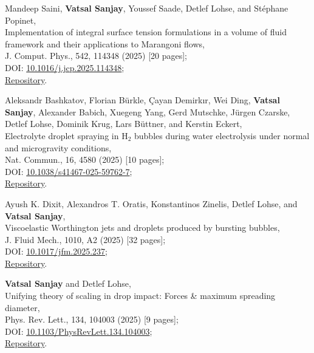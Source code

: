 \documentclass[10pt,a4paper,colorlinks,linkcolor=blue,urlcolor=blue,citecolor=blue]{moderncv}
\begin{document}
\begin{enumerate}[leftmargin=1.5em,label=\textbf{[\arabic*]}]
	\item Mandeep Saini, \textbf{Vatsal Sanjay}, Youssef Saade, Detlef Lohse, and Stéphane Popinet,\\
	Implementation of integral surface tension formulations in a volume of fluid framework and their applications to Marangoni flows,\\
	J. Comput. Phys., 542, 114348 (2025) [20 pages];\\
	\faFile\hspace{0.2em}DOI: \href{https://doi.org/10.1016/j.jcp.2025.114348}{10.1016/j.jcp.2025.114348};\\
	\faGithub\hspace{0.2em}\href{https://github.com/comphy-lab/marangoniSheet}{Repository}.

	\item Aleksandr Bashkatov, Florian Bürkle, Çayan Demirkır, Wei Ding, \textbf{Vatsal Sanjay}, Alexander Babich, Xuegeng Yang, Gerd Mutschke, Jürgen Czarske, Detlef Lohse, Dominik Krug, Lars Büttner, and Kerstin Eckert,\\
	Electrolyte droplet spraying in H$_2$ bubbles during water electrolysis under normal and microgravity conditions,\\
	Nat. Commun., 16, 4580 (2025) [10 pages];\\
	\faFile\hspace{0.2em}DOI: \href{https://doi.org/10.1038/s41467-025-59762-7}{10.1038/s41467-025-59762-7};\\
	\faGithub\hspace{0.2em}\href{https://github.com/VatsalSy/Asymmetries-in-coalescence}{Repository}.

	\item Ayush K. Dixit, Alexandros T. Oratis, Konstantinos Zinelis, Detlef Lohse, and \textbf{Vatsal Sanjay},\\
	Viscoelastic Worthington jets and droplets produced by bursting bubbles,\\
	J. Fluid Mech., 1010, A2 (2025) [32 pages];\\
	\faFile\hspace{0.2em}DOI: \href{https://doi.org/10.1017/jfm.2025.237}{10.1017/jfm.2025.237};\\
	\faGithub\hspace{0.2em}\href{https://github.com/comphy-lab/Viscoelastic-Worthington-jets-and-droplets-produced-by-bursting-bubbles}{Repository}.

	\item \textbf{Vatsal Sanjay} and Detlef Lohse,\\
	Unifying theory of scaling in drop impact: Forces \& maximum spreading diameter,\\
	Phys. Rev. Lett., 134, 104003 (2025) [9 pages];\\
	\faFile\hspace{0.2em}DOI: \href{https://doi.org/10.1103/PhysRevLett.134.104003}{10.1103/PhysRevLett.134.104003};\\
	\faGithub\hspace{0.2em}\href{https://github.com/comphy-lab/Drop-Impact}{Repository}.


\end{enumerate}
\end{document}
